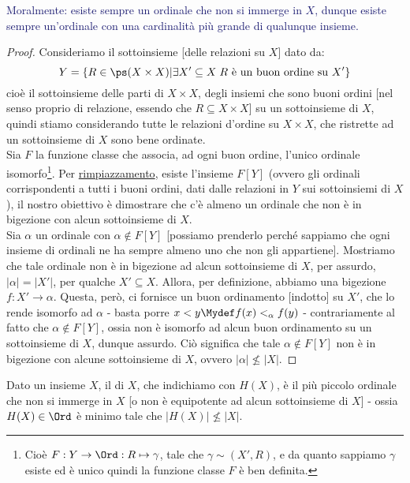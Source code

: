 \documentclass[11pt]{scrartcl}
\begin{document}
\textcolor{MidnightBlue}{Moralmente: esiste sempre un ordinale che non si immerge in $X$, dunque esiste sempre un'ordinale con una cardinalità più grande di qualunque insieme.}

\begin{proof}
	Consideriamo il sottoinsieme [delle relazioni su $X$] dato da:
	\[ Y = \{R \in \ps(X \times X) | \exists X' \subseteq X \; \text{$R$ è un buon ordine su $X'$}\}
		\]
	cioè il sottoinsieme delle parti di $X \times X$, degli insiemi che sono buoni ordini [nel senso proprio di relazione, essendo che $R \subseteq X\times X$] su un sottoinsieme di $X$, quindi stiamo considerando tutte le relazioni d'ordine su $X \times X$, 
	che ristrette ad un sottoinsieme di $X$ sono bene ordinate.\\
	Sia $F$ la funzione classe che associa, ad ogni buon ordine, l'unico ordinale isomorfo\footnote{Cioè $F : Y \rightarrow \Ord : R \mapsto \gamma$, tale che $\gamma \sim (X',R)$, e da quanto sappiamo $\gamma$ esiste ed è unico quindi la funzione classe $F$ è ben definita.}.
	Per \hyperref[ax8]{rimpiazzamento}, esiste l'insieme $F[Y]$ (ovvero gli ordinali corrispondenti a tutti i buoni ordini, dati dalle relazioni in $Y$ sui sottoinsiemi di $X$), il nostro obiettivo è dimostrare che c'è almeno un ordinale che non è in bigezione con alcun sottoinsieme di $X$.\\
	Sia $\alpha$ un ordinale con $\alpha \not \in F[Y]$ [possiamo prenderlo perché sappiamo che ogni insieme di ordinali ne ha sempre almeno uno che non gli appartiene]. Mostriamo che tale ordinale non è in bigezione ad alcun sottoinsieme di $X$, per assurdo, $|\alpha| = |X'|$, per qualche $X' \subseteq X$. Allora, per definizione,
	abbiamo una bigezione $f : X' \rightarrow \alpha$. Questa, però, ci fornisce un buon ordinamento [indotto] su $X'$, che lo rende isomorfo ad $\alpha$ -
	basta porre $x < y \Mydef f(x) <_\alpha f(y)$ - contrariamente al fatto che $\alpha \not \in F[Y]$, ossia non è isomorfo ad alcun buon ordinamento su un sottoinsieme di $X$, dunque assurdo. Ciò significa che tale $\alpha \not \in F[Y]$ non è in bigezione con alcune sottoinsieme di $X$, ovvero $|\alpha| \not\leq |X|$.
\end{proof}

\begin{definition}
	Dato un insieme $X$, il  di $X$, che indichiamo con $H(X)$, è il più piccolo ordinale che non si immerge in $X$ [o non è equipotente ad alcun sottoinsieme di $X$] - ossia $H(X) \in \Ord$ è minimo tale che $|H(X)| \not\leq |X|$.
\end{definition}
\end{document}
